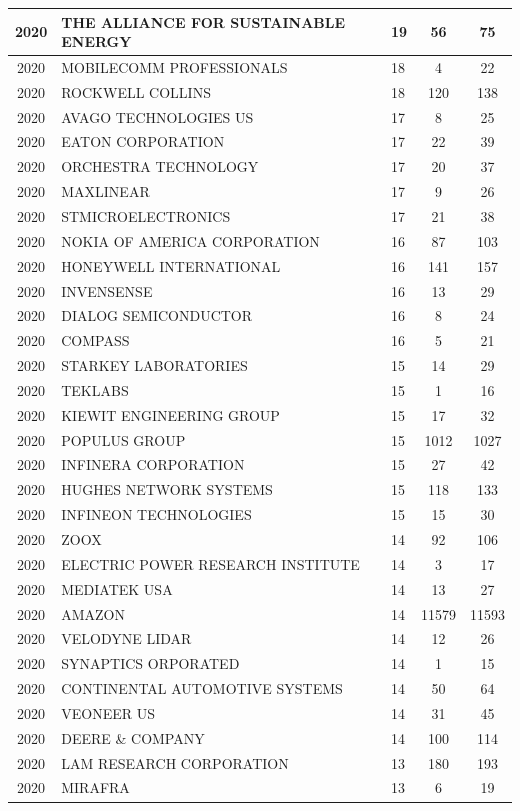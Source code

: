 \documentclass{article}%
\begin{document}
\begin{longtable}{c|p{20em}|p{5em}|c|c}
\hline%
2020&THE ALLIANCE FOR SUSTAINABLE ENERGY&19&56&75\\%
\hline%
2020&MOBILECOMM PROFESSIONALS&18&4&22\\%
\hline%
2020&ROCKWELL COLLINS&18&120&138\\%
\hline%
2020&AVAGO TECHNOLOGIES US&17&8&25\\%
\hline%
2020&EATON CORPORATION&17&22&39\\%
\hline%
2020&ORCHESTRA TECHNOLOGY&17&20&37\\%
\hline%
2020&MAXLINEAR&17&9&26\\%
\hline%
2020&STMICROELECTRONICS&17&21&38\\%
\hline%
2020&NOKIA OF AMERICA CORPORATION&16&87&103\\%
\hline%
2020&HONEYWELL INTERNATIONAL&16&141&157\\%
\hline%
2020&INVENSENSE&16&13&29\\%
\hline%
2020&DIALOG SEMICONDUCTOR&16&8&24\\%
\hline%
2020&COMPASS&16&5&21\\%
\hline%
2020&STARKEY LABORATORIES&15&14&29\\%
\hline%
2020&TEKLABS&15&1&16\\%
\hline%
2020&KIEWIT ENGINEERING GROUP&15&17&32\\%
\hline%
2020&POPULUS GROUP&15&1012&1027\\%
\hline%
2020&INFINERA CORPORATION&15&27&42\\%
\hline%
2020&HUGHES NETWORK SYSTEMS&15&118&133\\%
\hline%
2020&INFINEON TECHNOLOGIES&15&15&30\\%
\hline%
2020&ZOOX&14&92&106\\%
\hline%
2020&ELECTRIC POWER RESEARCH INSTITUTE&14&3&17\\%
\hline%
2020&MEDIATEK USA&14&13&27\\%
\hline%
2020&AMAZON&14&11579&11593\\%
\hline%
2020&VELODYNE LIDAR&14&12&26\\%
\hline%
2020&SYNAPTICS ORPORATED&14&1&15\\%
\hline%
2020&CONTINENTAL AUTOMOTIVE SYSTEMS&14&50&64\\%
\hline%
2020&VEONEER US&14&31&45\\%
\hline%
2020&DEERE \& COMPANY&14&100&114\\%
\hline%
2020&LAM RESEARCH CORPORATION&13&180&193\\%
\hline%
2020&MIRAFRA&13&6&19\\%

\end{longtable}
\end{document}
